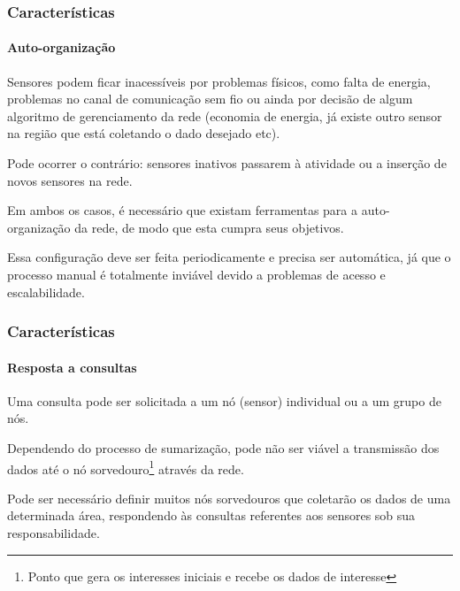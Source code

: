 \documentclass[notes]{beamer}
\begin{document}
\begin{frame}
\label{slide_20}
\frametitle{Características}
\framesubtitle{Auto-organização}

\begin{block}

Sensores podem ficar inacessíveis por problemas físicos, como falta de energia, problemas no canal de comunicação sem fio ou ainda por decisão de algum algoritmo de gerenciamento da rede (economia de energia, já existe outro sensor na região que está coletando o dado desejado etc). 

\end{block} \pause

\begin{block}

Pode ocorrer o contrário: sensores inativos passarem à atividade ou a inserção de novos sensores na rede. 
\end{block} \pause

\begin{block}

Em ambos os casos, é necessário que existam ferramentas para a auto-organização da rede, de modo que esta cumpra seus objetivos.

\end{block} \pause

\begin{alertblock}

Essa configuração deve ser feita periodicamente e precisa ser automática, já que o processo manual é totalmente inviável devido a problemas de acesso e escalabilidade. 
\end{alertblock}

\end{frame}

\begin{frame}
\label{slide_21}
\frametitle{Características}
\framesubtitle{Resposta a consultas}

\begin{block}

Uma consulta pode ser solicitada a um nó (sensor) individual ou a um grupo de nós.

\end{block} \pause

\begin{block}

Dependendo do processo de sumarização, pode não ser viável a transmissão dos dados até o nó sorvedouro\footnote{Ponto que gera os interesses iniciais e recebe os dados de interesse} através da rede. 
\end{block} \pause

\begin{block}

Pode ser necessário definir muitos nós sorvedouros que coletarão os dados de uma determinada área, respondendo às consultas referentes aos sensores sob sua responsabilidade.
\end{block} 

\end{frame}
\end{document}
